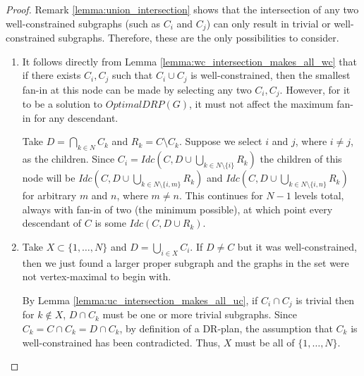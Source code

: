\begin{proof}
Remark \ref{lemma:union_intersection} shows that the intersection of any two well-constrained subgraphs (such as $C_i$ and $C_j$) can only result in trivial or well-constrained subgraphs. Therefore, these are the only possibilities to consider.


\begin{enumerate}
\item
It follows directly from Lemma \ref{lemma:wc_intersection_makes_all_wc} that if there exists $C_i, C_j$ such that $C_i \cup C_j$ is well-constrained, then the smallest fan-in at this node can be made by selecting any two $C_i, C_j$.
However, for it to be a solution to $OptimalDRP(G)$, it must not affect the maximum fan-in for any descendant.

Take $D=\bigcap_{k\in N}{C_k}$ and $R_k=C\setminus C_k$. Suppose we select $i$ and $j$, where $i\neq j$, as the children. Since
$C_i=Idc\left(C,D\cup\bigcup_{k\in N\setminus\{i\}}{R_k}\right)$
the children of this node will be
$Idc\left(C,D\cup\bigcup_{k\in N\setminus\{i,m\}}{R_k}\right)$
and
$Idc\left(C,D\cup\bigcup_{k\in N\setminus\{i,n\}}{R_k}\right)$
for arbitrary $m$ and $n$, where $m\neq n$. This continues for $N-1$ levels total, always with fan-in of two (the minimum possible), at which point every descendant of $C$ is some $Idc(C,D\cup R_k)$.


\item
Take $X\subset \{1,\ldots,N\}$ and $D=\bigcup_{i\in X}{C_i}$. If $D\neq C$ but it was well-constrained, then we just found a larger proper subgraph and the graphs in the set were not vertex-maximal to begin with.

\usestwod
By Lemma \ref{lemma:uc_intersection_makes_all_uc}, if $C_i \cap C_j$ is trivial then for $k\notin X$, $D\cap C_k$ must be one or more trivial subgraphs. Since $C_k=C\cap C_k=D\cap C_k$, by definition of a DR-plan, the assumption that $C_k$ is well-constrained has been contradicted. Thus, $X$ must be all of $\{1,\ldots,N\}$.
\end{enumerate}
\end{proof}

